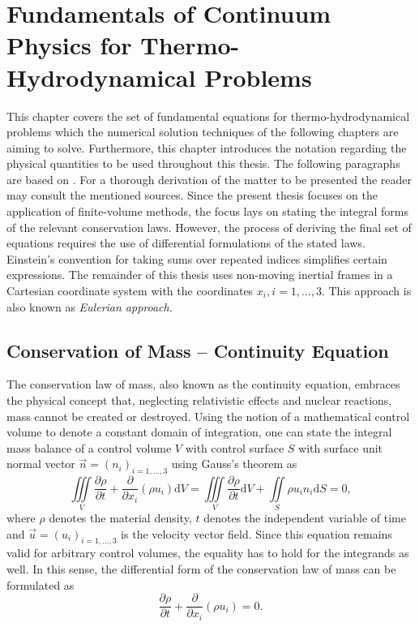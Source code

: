 \chapter{Fundamentals of Continuum Physics for Thermo-Hydrodynamical Problems}
\label{sec:fundamentals}

This chapter covers the set of fundamental equations for thermo-hydrodynamical problems which the numerical solution techniques of the following chapters are aiming to solve. Furthermore, this chapter introduces the notation regarding the physical quantities to be used throughout this thesis. The following paragraphs are based on \cite{andersson84,ferziger02,kundu12,spurk10}. For a thorough derivation of the matter to be presented the reader may consult the mentioned sources. Since the present thesis focuses on the application of finite-volume methods, the focus lays on stating the integral forms of the relevant conservation laws. However, the process of deriving the final set of equations requires the use of differential formulations of the stated laws. Einstein's convention for taking sums over repeated indices simplifies certain expressions. The remainder of this thesis uses non-moving inertial frames in a Cartesian coordinate system with the coordinates \( x_i, i=1,...,3 \). This approach is also known as \emph{Eulerian approach}.  

\section{Conservation of Mass -- Continuity Equation}

The conservation law of mass, also known as the continuity equation, embraces the physical concept that, neglecting relativistic effects and nuclear reactions, mass cannot be created or destroyed. Using the notion of a mathematical control volume to denote a constant domain of integration, one can state the integral mass balance of a control volume \(V\) with control surface \(S\) with surface unit normal vector \(\vec{n} = \left( n_i \right)_{i=1,\dots,3}\) using Gauss's theorem as
\begin{displaymath}
  \iiint\limits_V \frac{\partial \rho}{\partial t} + \frac{\partial}{\partial x_i}\left( \rho u_i \right) \mathrm{d}V 
  =  \iiint\limits_V \frac{\partial \rho}{\partial t} \mathrm{d}V + \iint\limits_S \rho u_i n_i \mathrm{d}S
  = 0,
\end{displaymath}
where \( \rho \) denotes the material density, \(t\) denotes the independent variable of time and \(\vec{u} = \left( u_i \right)_{i=1,\dots,3}\) is the velocity vector field. Since this equation remains valid for arbitrary control volumes, the equality has to hold for the integrands as well. In this sense, the differential form of the conservation law of mass can be formulated as
\begin{equation}
  \label{eq:contifull}
  \frac{\partial \rho}{\partial t} + \frac{\partial}{\partial x_i}\left( \rho u_i \right)
  = 0.
\end{equation}


